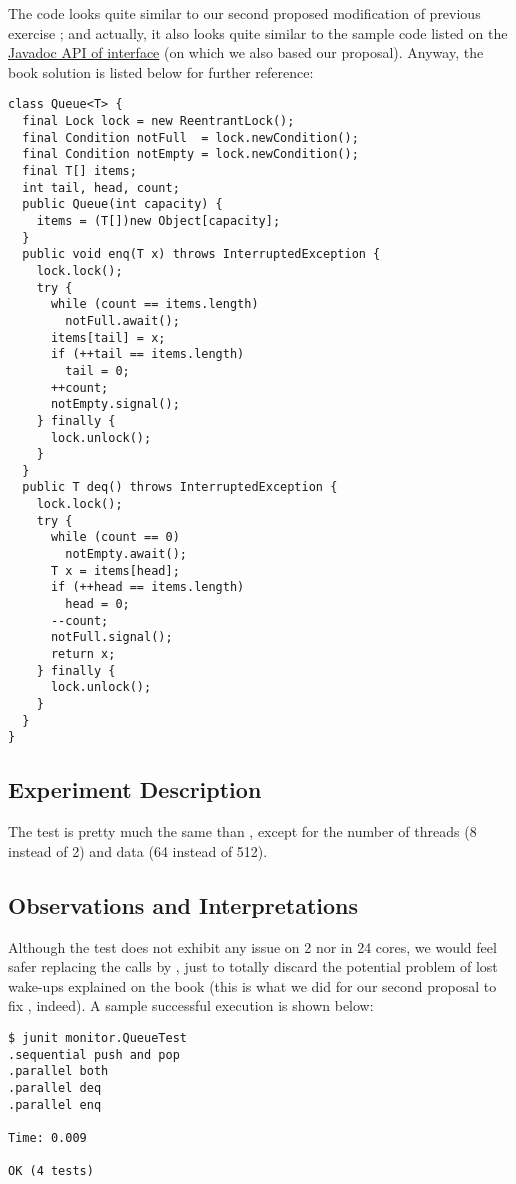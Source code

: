 The code looks quite similar to our second proposed modification of previous
exercise ; and actually, it also looks quite
similar to the sample code listed on the \href{http://docs.oracle.com/javase/7/docs/api/java/util/concurrent/locks/Condition.html}{Javadoc API of 
  interface} (on which we also based our proposal). Anyway, the book
solution is listed below for further reference: \\

\begin{lstlisting}[style=numbers]
class Queue<T> {
  final Lock lock = new ReentrantLock();
  final Condition notFull  = lock.newCondition();
  final Condition notEmpty = lock.newCondition();  
  final T[] items; 
  int tail, head, count;  
  public Queue(int capacity) {
    items = (T[])new Object[capacity];
  }
  public void enq(T x) throws InterruptedException {
    lock.lock();
    try {
      while (count == items.length)
        notFull.await();
      items[tail] = x;
      if (++tail == items.length)
        tail = 0;
      ++count;
      notEmpty.signal();
    } finally {
      lock.unlock();
    }
  }  
  public T deq() throws InterruptedException {
    lock.lock();
    try {
      while (count == 0)
        notEmpty.await();
      T x = items[head];
      if (++head == items.length)
        head = 0;
      --count;
      notFull.signal();
      return x;
    } finally {
      lock.unlock();
    }
  }
}
\end{lstlisting}
\hfill

\subsection{Experiment Description}

The test is pretty much the same than , except
for the number of threads (8 instead of 2) and data (64 instead of
512). 

\subsection{Observations and Interpretations}
Although the test does not exhibit any issue on 2 nor in 24 cores, we
would feel safer replacing the  calls by , just
to totally discard the potential problem of lost wake-ups explained on
the book (this is what we did for our second proposal to fix
, indeed). A sample successful execution is shown
below: \\ 

\begin{verbatim}
$ junit monitor.QueueTest
.sequential push and pop
.parallel both
.parallel deq
.parallel enq

Time: 0.009

OK (4 tests)
\end{verbatim}
\hfill

